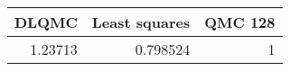 \begin{tabular}{rrr}
\toprule
   DLQMC &   Least squares &   QMC 128 \\
\midrule
 1.23713 &        0.798524 &         1 \\
\bottomrule
\end{tabular}
